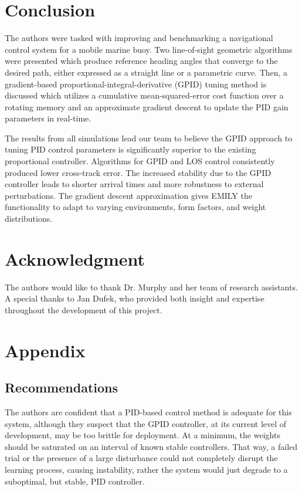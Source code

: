 \documentclass[conference]{IEEEtran}
\begin{document}

\section{Conclusion}
The authors were tasked with improving and benchmarking a navigational control system for a  mobile marine buoy. Two line-of-sight geometric algorithms were presented which produce reference heading angles that converge to the desired path, either expressed as a straight line or a parametric curve. Then, a gradient-based proportional-integral-derivative (GPID) tuning method is discussed which utilizes a cumulative mean-squared-error cost function over a rotating memory and an approximate gradient descent to update the PID gain parameters in real-time. 

The results from all simulations lead our team to believe the GPID approach to tuning PID control parameters is significantly superior to the existing proportional controller. Algorithms for GPID and LOS control consistently produced lower cross-track error. The increased stability due to the GPID controller leads to shorter arrival times and more robustness to external perturbations. The gradient descent approximation gives EMILY the functionality to adapt to varying environments, form factors, and weight distributions. 



\section*{Acknowledgment}
The authors would like to thank Dr. Murphy and her team of research assistants. A special thanks to Jan Dufek, who provided both insight and expertise throughout the development of this project. 


\section{Appendix}

\subsection{Recommendations}
The authors are confident that a PID-based control method is adequate for this system, although they suspect that the GPID controller, at its current level of development, may be too brittle for deployment. At a minimum, the weights should be saturated on an interval of known stable controllers. That way, a failed trial or the presence of a large disturbance could not completely disrupt the learning process, causing instability, rather the system would just degrade to a suboptimal, but stable, PID controller.
\end{document}

